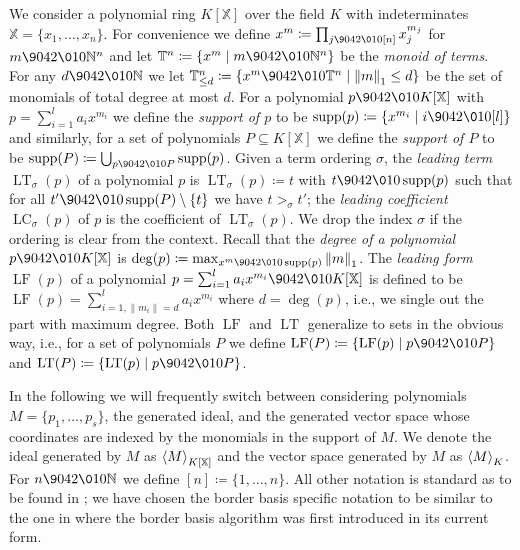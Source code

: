 \documentclass[11pt,oneside,english]{amsart}
\makeatletter
\numberwithin{equation}{section}
\numberwithin{figure}{section}
\theoremstyle{plain}
\theoremstyle{definition}
\theoremstyle{definition}
\theoremstyle{remark}
\theoremstyle{plain}
\theoremstyle{plain}
\theoremstyle{plain}
\theoremstyle{problem@}
\makeatother
\begin{document}
We consider a polynomial ring ${K[\mathbb{X}]}$ over the field $K$ with indeterminates
$\mathbb{X}=\{x_{1},\dots,x_{n}\}$. For convenience we define $x^{m}\coloneqq \prod_{j{\9042\010}[n]}x_{j}^{m_{j}}$
for $m{\9042\010}{\mathbb{N}}^{n}$ and let ${\mathbb{T}}^{n}\coloneqq \{x^{m}\mid m{\9042\010}{\mathbb{N}}^{n}\}$
be the \emph{monoid of terms}. For any $d{\9042\010}{\mathbb{N}}$ we let ${\mathbb{T}}_{\leq d}^{n}\coloneqq \{x^{m}{\9042\010}{\mathbb{T}}^{n}\mid{\lVert m \rVert}_{1}\leq d\}$
be the set of monomials of total degree at most $d$. For a polynomial
$p{\9042\010}{K[\mathbb{X}]}$ with $p=\sum_{i=1}^{l}a_{i}x^{m_{i}}$ we define the
\emph{support of $p$} to be $\operatorname{supp}(p)\coloneqq \{x^{m_{i}}\mid i{\9042\010}[l]\}$
and similarly, for a set of polynomials $P\subseteq{K[\mathbb{X}]}$ we define
the \emph{support of $P$} to be $\operatorname{supp}(P)\coloneqq \bigcup_{p{\9042\010} P}\operatorname{supp}(p)$.
Given a term ordering $\sigma$, the \emph{leading term} $\operatorname{LT}_{\sigma}(p)$
of a polynomial $p$ is $\operatorname{LT}_{\sigma}(p)\coloneqq t$ with $t{\9042\010}\operatorname{supp}(p)$
such that for all $t'{\9042\010}\operatorname{supp}(P)\setminus\{t\}$ we have $t>_{\sigma}t'$;
the \emph{leading coefficient} $\operatorname{LC}_{\sigma}(p)$ of $p$ is the
coefficient of $\operatorname{LT}_{\sigma}(p)$. We drop the index \(\sigma\) if
the ordering is clear from the context. Recall that the \emph{degree
of a polynomial} $p{\9042\010}{K[\mathbb{X}]}$ is $\deg(p)\coloneqq \max_{x^{m}{\9042\010}\operatorname{supp}(p)}{\lVert m \rVert}_{1}$.
The \emph{leading form} $\operatorname{LF}(p)$ of a polynomial $p=\sum_{i=1}^{l}a_{i}x^{m_{i}}{\9042\010}{K[\mathbb{X}]}$
is defined to be $\operatorname{LF}(p)=\sum_{i=1,{\lVert m_{i} \rVert}=d}^{l}a_{i}x^{m_{i}}$
where $d=\deg(p)$, i.e., we single out the part with maximum degree.
Both $\operatorname{LF}$ and $\operatorname{LT}$ generalize to sets in the obvious way, i.e.,
for a set of polynomials $P$ we define $\operatorname{LF}(P)\coloneqq \{\operatorname{LF}(p)\mid p{\9042\010} P\}$
and $\operatorname{LT}(P)\coloneqq \{\operatorname{LT}(p)\mid p{\9042\010} P\}$.

In the following we
will frequently switch between considering polynomials $M=\{p_{1},\dots,p_{s}\}$,
the generated ideal, and the generated vector space whose coordinates
are indexed by the monomials in the support of $M$. We denote the ideal
generated by $M$ as ${{\left\langle {M}\right\rangle}\sb{K[\mathbb{X}]}}$ and the vector space generated by
$M$ as ${{\left\langle {M}\right\rangle}\sb{K}}$. For $n{\9042\010}{\mathbb{N}}$ we define $[n] \coloneqq \{1,\dots,n\}$.
All other notation is standard as to be found in \cite{cox2007iva,kreuzer2000cca};
we have chosen the border basis specific notation to be similar to the one
in \cite{kehrein2006cbb} where the border basis algorithm was first
introduced in its current form.
\end{document}
